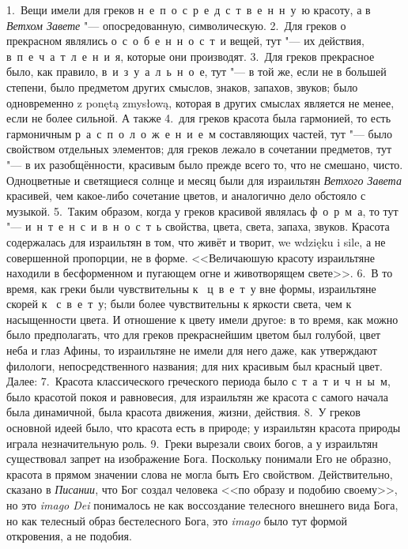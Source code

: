 1.~Вещи имели для греков н~е~п~о~с~р~е~д~с~т~в~е~н~н~у~ю красоту, а в \emph{Ветхом Завете} "--- опосредованную, символическую. 2.~Для греков о прекрасном являлись о~с~о~б~е~н~н~о~с~т~и вещей, тут "--- их действия, в~п~е~ч~а~т~л~е~н~и~я, которые они производят. 3.~Для греков прекрасное было, как правило, в~и~з~у~а~л~ь~н~о~е, тут "--- в той же, если не в большей степени, было предметом других смыслов, знаков, запахов, звуков; было одновременно z ponętą zmysłową, которая в других смыслах является не менее, если не более сильной. А также 4.~для греков красота была гармонией, то есть гармоничным р~а~с~п~о~л~о~ж~е~н~и~е~м составляющих частей, тут "--- было свойством отдельных элементов; для греков лежало в сочетании предметов, тут "--- в их разобщённости, красивым было прежде всего то, что не смешано, чисто. Одноцветные и светящиеся солнце и месяц были для израильтян \emph{Ветхого Завета} красивей, чем какое-либо сочетание цветов, и аналогично дело обстояло с музыкой. 5.~Таким образом, когда у греков красивой являлась ф~о~р~м~а, то тут "--- и~н~т~е~н~с~и~в~н~о~с~т~ь свойства, цвета, света, запаха, звуков. Красота содержалась для израильтян в том, что живёт и творит, we wdzięku i sile, а не совершенной пропорции, не в форме. <<Величаюшую красоту израильтяне находили в бесформенном и пугающем огне и животворящем свете>>. 6.~В то время, как греки были чувствительны к ~ц~в~е~т~у вне формы, израильтяне скорей к ~с~в~е~т~у; были более чувствительны к яркости света, чем к насыщенности цвета. И отношение к цвету имели другое: в то время, как можно было предполагать, что для греков прекраснейшим цветом был голубой, цвет неба и глаз Афины, то израильтяне не имели для него даже, как утверждают филологи, непосредственного названия; для них красивым был красный цвет. Далее: 7.~Красота классического греческого периода было с~т~а~т~и~ч~н~ы~м, было красотой покоя и равновесия, для израильтян же красота с самого начала была динамичной, была красота движения, жизни, действия. 8.~У греков основной идеей было, что красота есть в природе; у израильтян красота природы играла незначительную  роль. 9.~Греки вырезали своих богов, а у израильтян существовал запрет на изображение Бога. Поскольку понимали Его не образно, красота в прямом значении слова не могла быть Его свойством. Действительно, сказано в \emph{Писании}, что Бог создал человека <<по образу и подобию своему>>, но это {\sl imago Dei} понималось не как воссоздание телесного внешнего вида Бога, но как телесный образ бестелесного Бога, это {\sl imago} было тут формой откровения, а не подобия.

